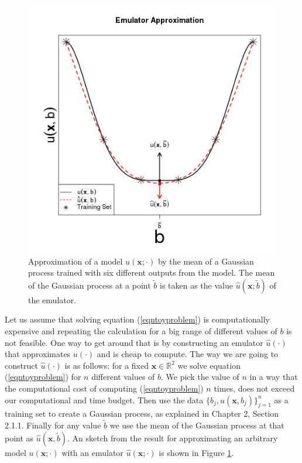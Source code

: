 \documentclass[12pt]{book}
\newcommand{\x}{\textbf{x}}
\begin{document}
\begin{figure}[H]
\centering
\includegraphics[scale=0.55]{./FigChap3/emulatorApproximation}
\caption{Approximation of a model $u(\x;\cdot)$ by the mean of a Gaussian process trained
with six  different  outputs from the model. The mean of the Gaussian process at a point $\tilde{b}$ is taken
as the value $\widehat{u}(\x;\tilde{b})$ of the emulator.}
\label{figGPCreation}
\end{figure}

 
Let us assume that solving
equation (\ref{eqntoyproblem}) is computationally expensive and repeating the calculation for a big range of 
different values of $b$
is not feasible. One way to get around that is by constructing an emulator $\widehat{u}(\cdot)$ that approximates $u(\cdot)$
and is cheap to compute. 
The way we are going to construct $\widehat{u}(\cdot)$ is as follows: for a fixed $\x\in\mathbb{R}^{2}$ we solve equation 
(\ref{eqntoyproblem}) for   $n$  different values of  $b$. We pick the value of $n$ in a way
that the computational cost of computing (\ref{eqntoyproblem}) $n$ times, does not exceed our
computational and time budget. Then use the data $\{b_{j},u(\x,b_{j})\}_{j=1}^{n}$  as a 
training set to create a Gaussian process, as explained in Chapter 2, Section 2.1.1. Finally
for any value $\tilde{b}$ we use the mean of the Gaussian process at that point as $\widehat{u}(\x,\tilde{b})$.
An sketch from the result for approximating an arbitrary model $u(\x;\cdot)$ with an emulator
$\widehat{u}(\x;\cdot)$ is shown
in Figure \ref{figGPCreation}.
\end{document}
